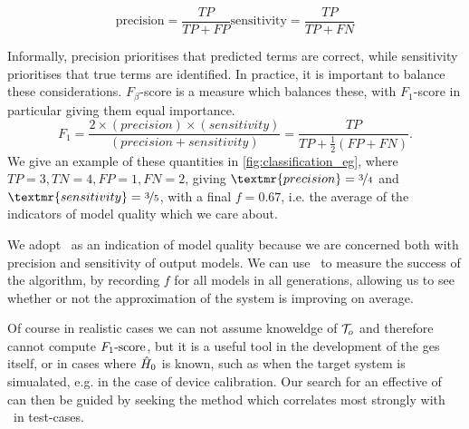 \begin{subequations}
    \begin{equation}
        \label{eqn:precision}
        \text{precision} = \frac{TP}{TP + FP}
    \end{equation}
       
    \begin{equation}
        \label{eqn:sensitivity}
        \text{sensitivity} = \frac{TP}{TP + FN}
    \end{equation}
\end{subequations}

Informally, precision prioritises that predicted terms are correct, 
    while sensitivity prioritises that true terms are identified. 
In practice, it is important to balance these considerations. 
$F_{\beta}$-score is a measure which balances these, with $F_1$-score in particular giving them equal importance. 
\begin{equation}
    \label{eqn:f1_score}
    F_1 = \frac{2\times (precision)\times(sensitivity)}{(precision + sensitivity)} = \frac{TP}{TP + \frac{1}{2}(FP + FN)}.
\end{equation}
We give an example of these quantities in \cref{fig:classification_eg}, 
    where $TP=3, TN=4, FP=1, FN=2$, giving $\textmr{precision} = \nicefrac{3}{4}$ 
    and $\textmr{sensitivity} = \nicefrac{3}{5}$, 
    with a final $f = 0.67$, i.e. the average of the indicators of model quality which we care about. 
\par 

We adopt \fs \ as an indication of model quality because we are concerned both with precision and sensitivity
    of output models. 
We can use \fs \ to measure the success of the algorithm,
    by recording $f$ for all models in all generations, allowing us to 
    see whether or not the approximation of the system is improving on average. 

Of course in realistic cases we can not assume knoweldge of ${ \mathcal{T} }_o$ and therefore cannot compute 
    $ F_{1}\text{-score} $, but it is a useful tool in the development of the \gls{ges} itself, 
    or in cases where $\hat{H}_0$ is known, such as when the target system is simualated, e.g. in the case of device calibration.
Our search for an effective \gls{of} can then be guided by seeking the 
    method which correlates most strongly with \fs \ in test-cases.

